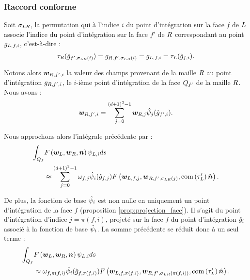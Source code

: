 \subsubsection{Raccord conforme}
\label{sssect:terme_de_flux_conforme}

\newcommand{\GLNFPermut}{\sigma_{\L \R}} %

Soit $\GLNFPermut$, la permutation qui à l'indice $i$ du point d’intégration sur la face $f$
de $L$ associe l'indice du point d’intégration sur la face $f'$ de $R$ correspondant
au point $g_{L,f,i}$, c’est-à-dire :
\begin{align}
	\TGeo{\R}(\GLN{f',\GLNFPermut(i)}) = \GLNPhy{\R}{f',\GLNFPermut(i)} =
	\GLNPhy{\L}{f,i} = \TGeo{\L}(\GLN{f,i}) .
\end{align}

Notons alors $\bm{w}_{R,f',i}$ la valeur des champs provenant de la maille $R$
au point d'intégration $g_{R,f',i}$, le $i$-ième point d'intégration de la face
$Q_{f'}$ de la maille $R$. Nous avons :
\begin{align}
	\bm{w}_{R,f',i} = \sum_{j=0}^{(d + 1)^3 - 1}
	\bm{w}_{R,j} \hat{\psi}_{j} (\hat{g}_{f',i}) .
\end{align}

Nous approchons alors l’intégrale précédente par :
\begin{equation}
	\begin{aligned}
		\int_{\QuadPhy_f} &\Flux{\W_\L}{\W_\R}{\n} \PsiPhy{\L}{i} ds \\
		&\approx \SSum{j} \GLW{f,j} \PsiRef{i}(\GLN{f,j})
			\Flux{\W_{\L,f,j}}{\W_{\R,f',\GLNFPermut(j)}}{
			\Com{\TGeo{\L}'} \hat{\n}} .
	\end{aligned}
\end{equation}

De plus, la fonction de base $\hat{\psi}_{i}$ est non nulle en uniquement un point
d’intégration de la face $f$ (proposition \ref{prop:projection_face}).
Il s'agit du point d'intégration d'indice $j = \pi(f,i)$, projeté sur la face $f$ du point
d'intégration $\hat{g}_{i}$ associé à la fonction de base $\hat{\psi}_{i}$.
La somme précédente se réduit donc à un seul terme :
\begin{equation}
	\begin{aligned}
		\int_{\QuadPhy_f} &\Flux{\W_\L}{\W_\R}{\n} \PsiPhy{\L}{i} ds \\
		&\approx \GLW{f,\pi(f,i)} \PsiRef{i}(\GLN{f,\pi(f,i)})
			\Flux{\W_{\L,f,\pi(f,i)}}{\W_{\R,f',\GLNFPermut(\pi(f,i))}}{
			\Com{\TGeo{\L}'} \hat{\n}}
		\label{eq:terme_de_flux} .
	\end{aligned}
\end{equation}


